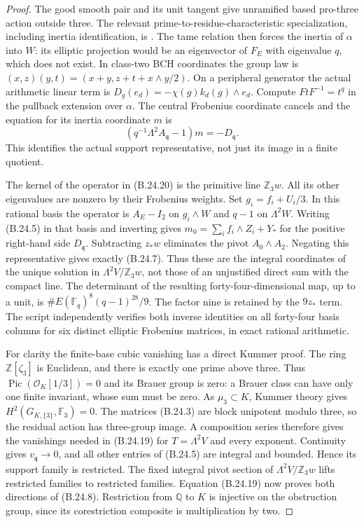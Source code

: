 \begin{proof}
The good smooth pair and its unit tangent give unramified
based pro-three action outside three. The relevant
prime-to-residue-characteristic specialization, including
inertia identification, is
\citet[Expos\'e XIII, \S\S2.9--2.12]{BSGA1}.
The tame relation then forces the inertia of $\alpha$
into $W$: its elliptic projection would be an eigenvector
of $F_E$ with eigenvalue $q$, which does not exist.
In class-two BCH coordinates the group law is
$(x,z)(y,t)=(x+y,z+t+x\wedge y/2)$.
On a peripheral generator the actual arithmetic linear
term is
$D_g(e_d)=-\chi(g)k_d(g)\wedge e_d$.
Compute $FtF^{-1}=t^q$ in the pullback extension over
$\alpha$. The central Frobenius coordinate cancels and
the equation for its inertia coordinate $m$ is
\[
 (q^{-1}\Lambda^2 A_{\mathfrak q}-1)m=-D_{\mathfrak q}.
                                                               \tag{B.24.20}
\]
This identifies the actual support representative, not
just its image in a finite quotient.

The kernel of the operator in (B.24.20) is the primitive
line $\mathbb Z_3w$. All its other eigenvalues are
nonzero by their Frobenius weights. Set
$g_i=f_i+U_i/3$. In this rational basis the operator is
$A_E-I_2$ on $g_i\wedge W$ and $q-1$ on $\Lambda^2W$.
Writing (B.24.5) in that basis and inverting gives
$m_0=\sum_i f_i\wedge Z_i+Y_*$ for the positive
right-hand side $D_{\mathfrak q}$.
Subtracting $z_*w$ eliminates the pivot $A_0\wedge A_2$.
Negating this representative gives exactly (B.24.7).
Thus these are the integral coordinates of the unique
solution in $\Lambda^2V/\mathbb Z_3w$, not those of an
unjustified direct sum with the compact line.
The determinant of the resulting forty-four-dimensional
map, up to a unit, is
$\#E(\mathbb F_q)^8(q-1)^{28}/9$.
The factor nine is retained by the $9z_*$ term.
The script independently verifies both inverse identities
on all forty-four basis columns for six distinct elliptic
Frobenius matrices, in exact rational arithmetic.

For clarity the finite-base cubic vanishing has a direct
Kummer proof. The ring $\mathbb Z[\zeta_3]$ is Euclidean,
and there is exactly one prime above three.
Thus $\operatorname{Pic}(\mathcal O_K[1/3])=0$ and
its Brauer group is zero: a Brauer class can have
only one finite invariant, whose sum must be zero.
As $\mu_3\subset K$, Kummer theory gives
$H^2(G_{K,\{3\}},\mathbb F_3)=0$.
The matrices (B.24.3) are block unipotent modulo three,
so the residual action has three-group image.
A composition series therefore
gives the vanishings needed in (B.24.19) for
$T=\Lambda^2V$ and every exponent.
Continuity gives $v_{\mathfrak q}\to0$, and all other
entries of (B.24.5) are integral and bounded. Hence its
support family is restricted. The fixed integral
pivot section of $\Lambda^2V/\mathbb Z_3w$ lifts
restricted families to restricted families.
Equation (B.24.19) now proves both directions of
(B.24.8). Restriction from $\mathbb Q$ to $K$ is
injective on the obstruction group, since its
corestriction composite is multiplication by two.


\end{proof}
